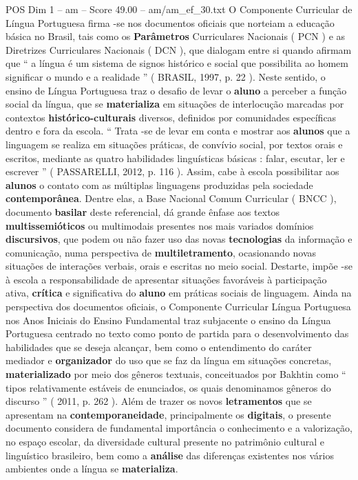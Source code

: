 \begin{textsample}{POS Dim 1 – am – Score 49.00 – am/am\_ef\_30.txt}  \label{ex:f1_pos_226}
O Componente Curricular de Língua Portuguesa firma -se nos documentos oficiais que norteiam a educação básica no Brasil, tais como os \textbf{Parâmetros} Curriculares Nacionais ( PCN ) e as Diretrizes Curriculares Nacionais ( DCN ), que dialogam entre si quando afirmam que “ a língua é um sistema de signos histórico e social que possibilita ao homem significar o mundo e a realidade ” ( BRASIL, 1997, p. 22 ).
Neste sentido, o ensino de Língua Portuguesa traz o desafio de levar o \textbf{aluno} a perceber a função social da língua, que se \textbf{materializa} em situações de interlocução marcadas por contextos \textbf{histórico-culturais} diversos, definidos por comunidades específicas dentro e fora da escola. “ Trata -se de levar em conta e mostrar aos \textbf{alunos} que a linguagem se realiza em situações práticas, de convívio social, por textos orais e escritos, mediante as quatro habilidades linguísticas básicas : falar, escutar, ler e escrever ” ( PASSARELLI, 2012, p. 116 ).
Assim, cabe à escola possibilitar aos \textbf{alunos} o contato com as múltiplas linguagens produzidas pela sociedade \textbf{contemporânea}.
Dentre elas, a Base Nacional Comum Curricular ( BNCC ), documento \textbf{basilar} deste referencial, dá grande ênfase aos textos \textbf{multissemióticos} ou multimodais presentes nos mais variados domínios \textbf{discursivos}, que podem ou não fazer uso das novas \textbf{tecnologias} da informação e comunicação, numa perspectiva de \textbf{multiletramento}, ocasionando novas situações de interações verbais, orais e escritas no meio social.
Destarte, impõe -se à escola a responsabilidade de apresentar situações favoráveis à participação ativa, \textbf{crítica} e significativa do \textbf{aluno} em práticas sociais de linguagem.
Ainda na perspectiva dos documentos oficiais, o Componente Curricular Língua Portuguesa nos Anos Iniciais do Ensino Fundamental traz subjacente o ensino da Língua Portuguesa centrado no texto como ponto de partida para o desenvolvimento das habilidades que se deseja alcançar, bem como o entendimento do caráter mediador e \textbf{organizador} do uso que se faz da língua em situações concretas, \textbf{materializado} por meio dos gêneros textuais, conceituados por Bakhtin como “ tipos relativamente estáveis de enunciados, os quais denominamos gêneros do discurso ” ( 2011, p. 262 ).
Além de trazer os novos \textbf{letramentos} que se apresentam na \textbf{contemporaneidade}, principalmente os \textbf{digitais}, o presente documento considera de fundamental importância o conhecimento e a valorização, no espaço escolar, da diversidade cultural presente no patrimônio cultural e linguístico brasileiro, bem como a \textbf{análise} das diferenças existentes nos vários ambientes onde a língua se \textbf{materializa}.

\end{textsample}
